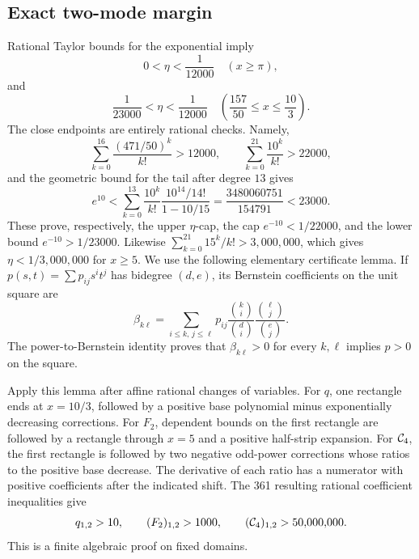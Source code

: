 \subsection{Exact two-mode margin}

Rational Taylor bounds for the exponential imply
\[
 0<\eta<\frac1{12000}\quad(x\geq\pi),
\]
and
\[
 \frac1{23000}<\eta<\frac1{12000}
 \quad\left(\frac{157}{50}\leq x\leq\frac{10}{3}\right).
\]
The close endpoints are entirely rational checks. Namely,
\[
 \sum_{k=0}^{16}\frac{(471/50)^k}{k!}>12000,\qquad
 \sum_{k=0}^{21}\frac{10^k}{k!}>22000,
\]
and the geometric bound for the tail after degree \(13\) gives
\[
 e^{10}<
 \sum_{k=0}^{13}\frac{10^k}{k!}
 \frac{10^{14}/14!}{1-10/15}
 =\frac{3480060751}{154791}<23000.
\]
These prove, respectively, the upper \(\eta\)-cap, the cap
\(e^{-10}<1/22000\), and the lower bound \(e^{-10}>1/23000\).
Likewise \(\sum_{k=0}^{21}15^k/k!>3{,}000{,}000\), which gives
\(\eta<1/3{,}000{,}000\) for \(x\geq5\).
We use the following elementary certificate lemma. If
\(p(s,t)=\sum p_{ij}s^it^j\) has bidegree \((d,e)\), its Bernstein
coefficients on the unit square are
\[
 \beta_{k\ell}=\sum_{i\leq k,\,j\leq\ell}
 p_{ij}\frac{\binom{k}{i}}{\binom{d}{i}}
       \frac{\binom{\ell}{j}}{\binom{e}{j}}.
\]
The power-to-Bernstein identity proves that \(\beta_{k\ell}>0\) for every
\(k,\ell\) implies \(p>0\) on the square.

Apply this lemma after affine rational changes of variables. For \(q\), one
rectangle ends at \(x=10/3\), followed by a positive base polynomial minus
exponentially decreasing corrections. For \(F_2\), dependent bounds on the
first rectangle are followed by a rectangle through \(x=5\) and a positive
half-strip expansion. For \(\mathcal{C}_4\), the first rectangle is followed by two
negative odd-power corrections whose ratios to the positive base decrease.
The derivative of each ratio has a numerator with positive coefficients after
the indicated shift. The 361 resulting rational coefficient inequalities give
\begin{equation}\label{eq:two-mode-margin}
 q_{1,2}>10,\qquad (F_2)_{1,2}>1000,\qquad
 (\mathcal{C}_4)_{1,2}>50{,}000{,}000.
\end{equation}
This is a finite algebraic proof on fixed domains.

